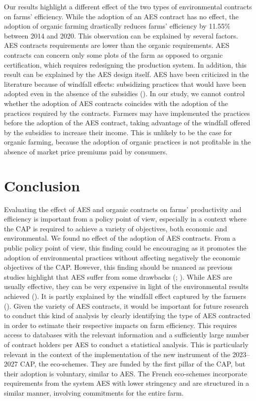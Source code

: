 \begin{Article}
\begin{refsection}[Lassalas]
Our results highlight a different effect of the two types of
environmental contracts on farms' efficiency. While the adoption of an
AES contract has no effect, the adoption of organic farming drastically
reduces farms' efficiency by 11.55\% between 2014 and 2020. This
observation can be explained by several factors. AES contracts
requirements are lower than the organic requirements. AES contracts can
concern only some plots of the farm as opposed to organic certification,
which requires redesigning the production system. In addition, this
result can be explained by the AES design itself. AES have been
criticized in the literature because of windfall effects: subsidizing
practices that would have been adopted even in the absence of the
subsidies (\textcite{chabe2013}). In our study, we
cannot control whether the adoption of AES contracts coincides with the
adoption of the practices required by the contracts. Farmers may have
implemented the practices before the adoption of the AES contract,
taking advantage of the windfall offered by the subsidies to increase
their income. This is unlikely to be the case for organic farming,
because the adoption of organic practices is not profitable in the
absence of market price premiums paid by consumers.

\section{Conclusion}

Evaluating the effect of AES and organic contracts on farms'
productivity and efficiency is important from a policy point of view,
especially in a context where the CAP is required to achieve a variety
of objectives, both economic and environmental. We found no effect of
the adoption of AES contracts. From a public policy point of view, this
finding could be encouraging as it promotes the adoption of
environmental practices without affecting negatively the economic
objectives of the CAP. However, this finding should be nuanced as
previous studies highlight that AES suffer from some drawbacks (\textcite{uthes_matzdorf_2013}; \textcite{dupraz_guyomard_2019}). While AES are
usually effective, they can be very expensive in light of the
environmental results achieved (\textcite{batary2015role}). It is
partly explained by the windfall effect captured by the farmers
(\textcite{chabe2013}). Given the variety of AES
contracts, it would be important for future research to conduct this
kind of analysis by clearly identifying the type of AES contracted in
order to estimate their respective impacts on farm efficiency. This
requires access to databases with the relevant information and a
sufficiently large number of contract holders per AES to conduct a
statistical analysis. This is particularly relevant in the context of
the implementation of the new instrument of the 2023--2027 CAP, the
eco-schemes. They are funded by the first pillar of the CAP, but their
adoption is voluntary, similar to AES. The French eco-schemes
incorporate requirements from the system AES with lower stringency and
are structured in a similar manner, involving commitments for the entire
farm.


\end{refsection}
\end{Article}
